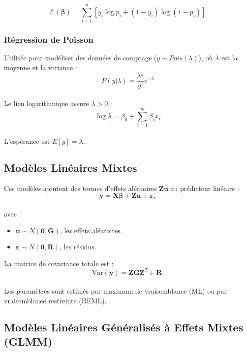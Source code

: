 \documentclass[
]{article}
\begin{document}
\begin{tcolorbox}[colback=mybrown!10!white, colframe=mybrown!80!black, boxrule=0.5mm]
$$ \ell(\boldsymbol{\beta}) = \sum_{i=1}^n \left[ y_i \log{p_i} + (1-y_i) \log{(1-p_i)} \right]. $$
\end{tcolorbox}

\subsubsection{Régression de Poisson}\label{ruxe9gression-de-poisson}

Utilisée pour modéliser des données de comptage
(\(y \sim Pois(\lambda)\)), où \(\lambda\) est la moyenne et la variance
:\\
\[ P(y | \lambda) = \frac{\lambda^y}{y!} e^{-\lambda} \]\\
Le lien logarithmique assure \(\lambda > 0\) :\\
\[ \log{\lambda} = \beta_0 + \sum_{i=1}^m \beta_i x_i \]\\
L'espérance est \(E[y] = \lambda\).

\subsection{Modèles Linéaires
Mixtes}\label{moduxe8les-linuxe9aires-mixtes}

Ces modèles ajoutent des termes d'effets aléatoires
\(\mathbf{Z} \mathbf{u}\) au prédicteur linéaire :\\
\[ \mathbf{y} = \mathbf{X} \boldsymbol{\beta} + \mathbf{Z} \mathbf{u} + \boldsymbol{\varepsilon}, \]\\
avec :

\begin{itemize}
\item
  \(\mathbf{u} \sim N(\mathbf{0}, \mathbf{G})\), les effets aléatoires.
\item
  \(\boldsymbol{\varepsilon} \sim N(\mathbf{0}, \mathbf{R})\), les
  résidus.
\end{itemize}

La matrice de covariance totale est :\\
\[ \mathrm{Var}(\mathbf{y}) = \mathbf{Z} \mathbf{G} \mathbf{Z}^T + \mathbf{R}. \]\\
Les paramètres sont estimés par maximum de vraisemblance (ML) ou par
vraisemblance restreinte (REML).

\subsection{Modèles Linéaires Généralisés à Effets Mixtes
(GLMM)}\label{moduxe8les-linuxe9aires-guxe9nuxe9ralisuxe9s-uxe0-effets-mixtes-glmm}
\end{document}
